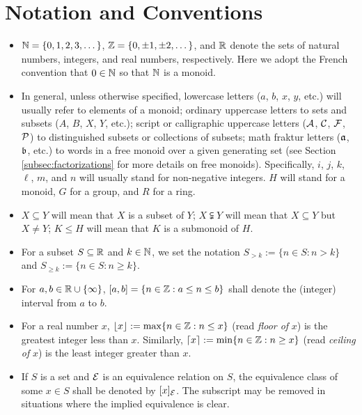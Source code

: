 \section{Notation and Conventions} \label{subsec:generalities}

\begin{itemize}
	\item $\NN = \{0,1,2,3,\dots\}$, $\ZZ = \{0,\pm 1, \pm 2,\dots\}$, and $\RR$ denote the sets of natural numbers, integers, and real numbers, respectively.
	Here we adopt the French convention that $0\in \NN$ so that $\NN$ is a monoid.
	
	\item In general, unless otherwise specified, lowercase letters ($a$, $b$, $x$, $y$, etc.) will usually refer to elements of a monoid; 
	ordinary uppercase letters to sets and subsets ($A$, $B$, $X$, $Y$, etc.); 
	script or calligraphic uppercase letters ($\A$, $\C$, $\F$, $\P$) to distinguished subsets or collections of subsets; 
	math fraktur letters ($\aa$, $\bb$, etc.) to words in a free monoid over a given generating set 
	(see Section \ref{subsec:factorizations} for more details on free monoids).
	Specifically, $i$, $j$, $k$, $\ell$, $m$, and $n$ will usually stand for non-negative integers. 
	$H$ will stand for a monoid, $G$ for a group, and $R$ for a ring.
	
	\item $X\subseteq Y$ will mean that $X$ is a subset of $Y$; $X\subsetneqq Y$ will mean that $X\subseteq Y$ but $X\neq Y$; $K\le H$ will mean that $K$ is a submonoid of $H$.
	
	\item For a subset $S\subseteq \RR$ and $k\in \NN$, we set the notation $S_{>k} := \{n\in S: n>k\}$ and $S_{\ge k} := \{n\in S: n\ge k\}$.
	
	\item For $a, b\in \RR\cup\{\infty\}$, $[ a,b ] = \{ n\in \ZZ : a \le n \le b \}$ shall denote the (integer) interval from $a$ to $b$.
	
	\item For a real number $x$, $\lfloor x \rfloor := \max\{n\in \ZZ: n \le x\}$ (read \textit{floor of} $x$) is the greatest integer less than $x$.
	Similarly, $\lceil x \rceil := \min\{n\in \ZZ: n\ge x\}$ (read \textit{ceiling of} $x$) is the least integer greater than $x$.
	
	\item If $S$ is a set and $\E$ is an equivalence relation on $S$, the equivalence class of some $x\in S$ shall be denoted by $[x]_\E$.
	The subscript may be removed in situations where the implied equivalence is clear.
	

\end{itemize}

